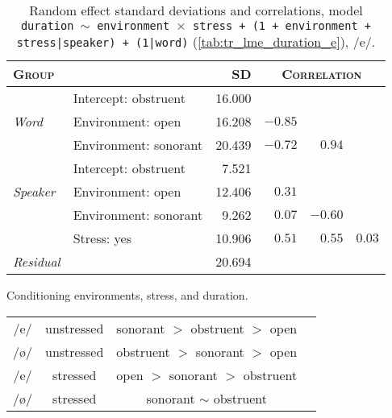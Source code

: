 \begin{table}[H]
  \centering
  \begin{tabular}{llrrrr}
    \toprule
    \textsc{Group} & \textsc{} & \textsc{SD} & \multicolumn{3}{c}{\textsc{Correlation}}\\
    \midrule
    \multirow{3}{*}{\textit{Word}} & Intercept: obstruent & 16.000  \\
                & Environment: open & 16.208 & $-0.85$  \\
                & Environment: sonorant & 20.439 & $-0.72$ & $0.94$  \\
    \midrule
    \multirow{3}{*}{\textit{Speaker}} & Intercept: obstruent & 7.521  \\
                & Environment: open & 12.406 & $0.31$  \\
                & Environment: sonorant & 9.262 & $0.07$ & $-0.60$  \\
                & Stress: yes & 10.906 & $0.51$ & $0.55$ & $0.03$ \\
    \midrule
    \textit{Residual} & & 20.694\\
    \bottomrule
  \end{tabular}
  \caption[\texttt{\footnotesize dur $\sim$ environment$\times$stress + (1 + environment + stress|speaker) + (1|word)}, /ø/]{Random effect standard deviations and correlations, model \texttt{duration $\sim$ environment $\times$ stress + (1 + environment + stress|speaker) + (1|word)} (\cref{tab:tr_lme_duration_e}), /e/.}
  \label{tab:tr_lme_duration_e_random}
\end{table}

\begin{example}\label{dur_relationship} Conditioning environments, stress, and duration. \\ \medskip
\centering

\begin{tabular}{cccc}
\toprule
{}{vowel} & {stress} & {duration by environment} \\
\midrule
/e/ & unstressed & sonorant $>$ obstruent $>$ open \\
/ø/ & unstressed & obstruent $>$ sonorant $>$ open \\
\midrule
/e/ & stressed & open $>$ sonorant $>$ obstruent \\
/ø/ & stressed & sonorant $\sim$ obstruent \\
\bottomrule
\end{tabular}
\end{example}
\bigskip


